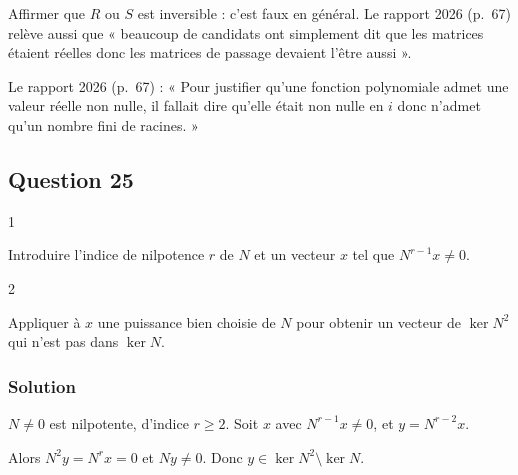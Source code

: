 \documentclass[11pt,a4paper]{article}
\newcommand{\equationajustee}[1]{%
  \sbox{\boiteequation}{$\displaystyle #1$}%
  \ifdim\wd\boiteequation>\linewidth
    \[\resizebox{\linewidth}{!}{\usebox{\boiteequation}}\]%
  \else
    \[#1\]%
  \fi}
\begin{document}
\equationajustee{\boxed{A=QBQ^{-1},\ Q\in{\mathrm{GL}}_n(\mathbb R).}}

\begin{piege}

Affirmer que \(R\) ou \(S\) est inversible : c'est faux en général. Le rapport 2026 (p.~67) relève aussi que « beaucoup de candidats ont simplement dit que les matrices étaient réelles donc les matrices de passage devaient l'être aussi ».

\end{piege}

\begin{jury}

Le rapport 2026 (p.~67) : « Pour justifier qu'une fonction polynomiale admet une valeur réelle non nulle, il fallait dire qu'elle était non nulle en \(i\) donc n'admet qu'un nombre fini de racines. »

\end{jury}

\hypertarget{question-25}{%
\subsection{Question 25}\label{question-25}}

\begin{indication}{1}

Introduire l'indice de nilpotence \(r\) de \(N\) et un vecteur \(x\) tel que \(N^{r-1}x\ne0\).

\end{indication}

\begin{indication}{2}

Appliquer à \(x\) une puissance bien choisie de \(N\) pour obtenir un vecteur de \(\ker N^2\) qui n'est pas dans \(\ker N\).

\end{indication}

\hypertarget{solution-24}{%
\subsubsection{Solution}\label{solution-24}}

\(N\ne0\) est nilpotente, d'indice \(r\ge2\). Soit \(x\) avec \(N^{r-1}x\ne0\), et \(y=N^{r-2}x\).

Alors \(N^2y=N^rx=0\) et \(Ny\ne0\). Donc \(y\in\ker N^2\setminus\ker N\).

\equationajustee{\boxed{\ker N\ne\ker N^2}}
\end{document}
